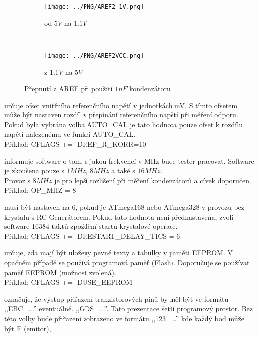 \begin{figure}[H]
  \begin{subfigure}[b]{.5\textwidth}
    \centering
    \texttt{[image: ../PNG/AREF2\_1V.png]}
    \caption{od \(5V\) na \(1.1V\) }
    \label{pic:aref1}
  \end{subfigure}
  ~
  \begin{subfigure}[b]{.5\textwidth}
    \centering
    \texttt{[image: ../PNG/AREF2VCC.png]}
    \caption{z \(1.1V\) na \(5V\)}
    \label{pic:aref5}
  \end{subfigure}
  \caption{Přepnutí z AREF při použití \(1nF\) kondenzátoru}
\end{figure}

\begin{description} \setlength{\itemsep}{0em}
  \item[REF\_R\_KORR] určuje ofset vnitřního referenčního napětí v jednotkách mV.
S tímto ofsetem může být nastaven rozdíl v přepínání referenčního napětí při měření odporu.
Pokud byla vybrána volba AUTO\_CAL je tato hodnota pouze ofset k rozdílu napětí nalezenému ve
funkci AUTO\_CAL.\\
Příklad: CFLAGS += -DREF\_R\_KORR=10
  \item[OP\_MHZ] informuje software o tom, s jakou frekvencí v MHz bude tester pracovat.
Software je zkoušena pouze s \(1MHz\), \(8MHz\) a také s \(16MHz\).\\ Provoz s \(8MHz\) je pro lepší rozlišení
při měření kondenzátorů a cívek doporučen.\\
Příklad: OP\_MHZ = 8
  \item[RESTART\_DELAY\_TICS] musí být nastaven na 6, pokud je ATmega168 nebo ATmega328 v provozu
bez krystalu s RC Generátorem.
Pokud tato hodnota není přednastavena, zvolí software 16384 taktů zpoždění startu krystalové operace.\\
Příklad: CFLAGS += -DRESTART\_DELAY\_TICS = 6
  \item[USE\_EEPROM] určuje, zda mají být uloženy pevné texty a tabulky v paměti EEPROM.
V opačném případě se používá programová paměť (Flash).
Doporučuje se používat paměť EEPROM (možnost zvolená).\\
Příklad: CFLAGS += -DUSE\_EEPROM
  \item[EBC\_STYLE] označuje, že výstup přiřazení tranzistorových pinů by měl být ve
formátu  ,,EBC=...'' eventuálně. ,,GDS=...''.
Tato prezentace šetří programový prostor.
Bez této volby bude přiřazení zobrazeno ve formátu ,,123=...'' kde každý bod může být E (emitor),

\end{description}
